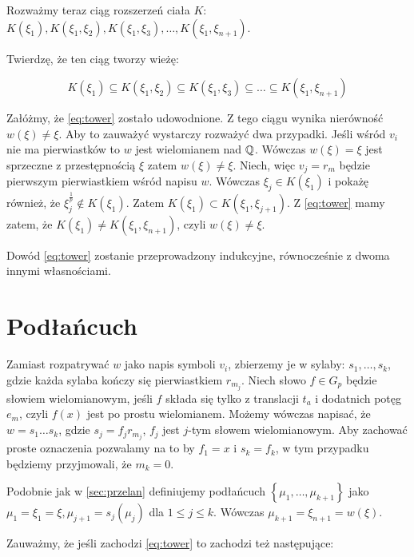 Rozważmy teraz ciąg rozszerzeń ciała $K$:
$
K\left(\xi_1\right),
K\left(\xi_1, \xi_2\right),
K\left(\xi_1, \xi_3\right),
\ldots,
K\left(\xi_1, \xi_{n+1}\right)$.

Twierdzę, że ten ciąg tworzy wieżę:

\begin{equation}
K\left(\xi_1\right) \subseteq
K\left(\xi_1, \xi_2\right) \subseteq
K\left(\xi_1, \xi_3\right) \subseteq 
\ldots
\subseteq
K\left(\xi_1, \xi_{n+1}\right)
\label{eq:tower}
\end{equation}

Załóżmy, że \ref{eq:tower} zostało udowodnione. Z tego ciągu wynika nierówność
$w\left(\xi\right) \neq \xi$. Aby to zauważyć wystarczy rozważyć dwa przypadki.
Jeśli wśród $v_i$ nie ma pierwiastków to $w$ jest wielomianem nad $\mathbb{Q}$. Wówczas
$w(\xi) = \xi$ jest sprzeczne z przestępnością $\xi$ zatem $w(\xi) \neq \xi$.
Niech, więc $v_j = r_m$ będzie pierwszym pierwiastkiem wśród napisu $w$. Wówczas
$\xi_j \in K\left(\xi_1\right)$ i pokażę również, że $\xi_{j}^{\frac{1}{p}} \not
\in K(\xi_1)$. Zatem $K\left(\xi_1\right) \subset K\left(\xi_1,
\xi_{j+1}\right)$. Z \ref{eq:tower} mamy zatem, że $K\left(\xi_1\right) \neq
  K\left(\xi_1, \xi_{n+1}\right)$, czyli $w(\xi) \neq \xi$.

Dowód \ref{eq:tower} zostanie przeprowadzony indukcyjne, równocześnie z dwoma
innymi własnościami.

\section{Podłańcuch}

Zamiast rozpatrywać $w$ jako napis symboli $v_i$, zbierzemy je w sylaby: $s_1,
\ldots, s_k$, gdzie każda sylaba kończy się pierwiastkiem $r_{m_j}$. Niech słowo
$f \in G_p$ będzie słowiem wielomianowym, jeśli $f$ składa się tylko z
translacji $t_a$ i dodatnich potęg $e_m$, czyli $f(x)$ jest po prostu
wielomianem. Możemy wówczas napisać, że $w = s_1\ldots s_k$, gdzie $s_j =
f_jr_{m_j}$, $f_j$ jest $j$-tym słowem wielomianowym. Aby zachować proste
oznaczenia pozwalamy na to by $f_1 = x$  i $s_k = f_k$, w tym przypadku będziemy
przyjmowali, że $m_k = 0$. 

Podobnie jak w 
\ref{sec:przelan} definiujemy podłańcuch $\left\{\mu_1, \ldots,
\mu_{k+1}\right\}$ jako $\mu_1 = \xi_1 = \xi, \mu_{j+1} = s_j\left(\mu_j\right)$
dla $1 \leq j \leq k$. Wówczas $\mu_{k+1} = \xi_{n+1} = w(\xi)$.

Zauważmy, że jeśli zachodzi \ref{eq:tower} to zachodzi też następujące:

